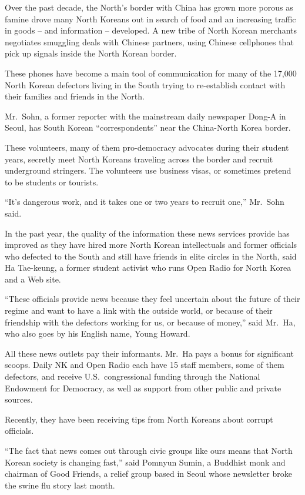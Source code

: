 ﻿\documentclass[12pt]{article}
\begin{document}
Over the past decade, the North's border with China has grown more porous as famine drove many North
Koreans out in search of food and an increasing traffic in goods -- and information -- developed. A
new tribe of North Korean merchants negotiates smuggling deals with Chinese partners, using Chinese
cellphones that pick up signals inside the North Korean border.

These phones have become a main tool of communication for many of the 17,000 North Korean defectors
living in the South trying to re-establish contact with their families and friends in the North.

Mr.~Sohn, a former reporter with the mainstream daily newspaper Dong-A in Seoul, has South Korean
``correspondents'' near the China-North Korea border.

These volunteers, many of them pro-democracy advocates during their student years, secretly meet
North Koreans traveling across the border and recruit underground stringers. The volunteers use
business visas, or sometimes pretend to be students or tourists.

``It's dangerous work, and it takes one or two years to recruit one,'' Mr.~Sohn said.

In the past year, the quality of the information these news services provide has improved as they
have hired more North Korean intellectuals and former officials who defected to the South and still
have friends in elite circles in the North, said Ha Tae-keung, a former student activist who runs
Open Radio for North Korea and a Web site.

``These officials provide news because they feel uncertain about the future of their regime and want
to have a link with the outside world, or because of their friendship with the defectors working for
us, or because of money,'' said Mr.~Ha, who also goes by his English name, Young Howard.

All these news outlets pay their informants. Mr.~Ha pays a bonus for significant scoops. Daily NK
and Open Radio each have 15 staff members, some of them defectors, and receive U.S.~congressional
funding through the National Endowment for Democracy, as well as support from other public and
private sources.

Recently, they have been receiving tips from North Koreans about corrupt officials.

``The fact that news comes out through civic groups like ours means that North Korean society is
changing fast,'' said Pomnyun Sumin, a Buddhist monk and chairman of Good Friends, a relief group
based in Seoul whose newsletter broke the swine flu story last month.
\end{document}
